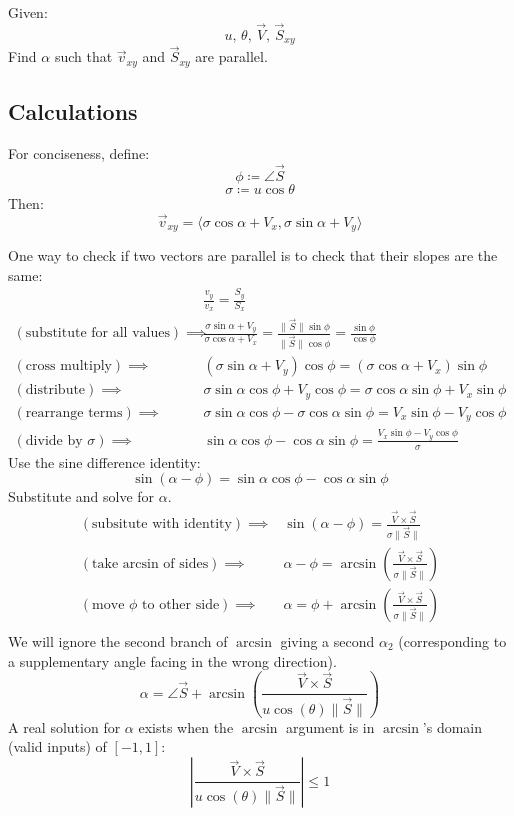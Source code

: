 \documentclass{article}
\begin{document}
Given:
\[ u,\,\theta,\,\vec{V},\,\vec{S}_{xy} \]
Find $\alpha$ such that $\vec{v}_{xy}$ and $\vec{S}_{xy}$ are parallel.

\subsection*{Calculations}
For conciseness, define:
\[ \phi\coloneqq\angle\vec{S} \]
\[ \sigma\coloneqq u\cos\theta \]
Then:
\[ \vec{v}_{xy}=\langle \sigma\cos\alpha+V_x,\sigma\sin\alpha+V_y \rangle \]

One way to check if two vectors are parallel is to check that their slopes are the same:
\begin{align*}
    &\frac{v_y}{v_x}=\frac{S_y}{S_x} \\
    (\text{substitute for all values})\implies&\frac{\sigma\sin\alpha+V_y}{\sigma\cos\alpha+V_x}=\frac{\lVert\vec{S}\rVert\sin\phi}{\lVert\vec{S}\rVert\cos\phi}=\frac{\sin\phi}{\cos\phi} \\
    (\text{cross multiply})\implies&(\sigma\sin\alpha+V_y)\cos\phi=(\sigma\cos\alpha+V_x)\sin\phi \\
    (\text{distribute})\implies&\sigma\sin\alpha\cos\phi+V_y\cos\phi=\sigma\cos\alpha\sin\phi+V_x\sin\phi \\
    (\text{rearrange terms})\implies&\sigma\sin\alpha\cos\phi-\sigma\cos\alpha\sin\phi=V_x\sin\phi-V_y\cos\phi \\
    (\text{divide by }\sigma)\implies&\sin\alpha\cos\phi-\cos\alpha\sin\phi=\frac{V_x\sin\phi-V_y\cos\phi}{\sigma}
\end{align*}
Use the sine difference identity:
\[ \sin(\alpha-\phi)=\sin\alpha\cos\phi-\cos\alpha\sin\phi \]
Substitute and solve for $\alpha$.
\begin{align*}
    (\text{subsitute with identity})\implies&\sin(\alpha-\phi)=\frac{\vec{V}\times\vec{S}}{\sigma\lVert\vec{S}\rVert} \\
    (\text{take arcsin of sides})\implies&\alpha-\phi=\arcsin\left(\frac{\vec{V}\times\vec{S}}{\sigma\lVert\vec{S}\rVert}\right) \\
    (\text{move }\phi\text{ to other side})\implies&\alpha=\phi+\arcsin\left(\frac{\vec{V}\times\vec{S}}{\sigma\lVert\vec{S}\rVert}\right) \\
\end{align*} 
We will ignore the second branch of $\arcsin$ giving a second $\alpha_2$ (corresponding to a supplementary angle facing in the wrong direction).
\[ \boxed{\alpha=\angle\vec{S}+\arcsin\left(\frac{\vec{V}\times\vec{S}}{u\cos(\theta)\lVert\vec{S}\rVert}\right)} \]
A real solution for $\alpha$ exists when the $\arcsin$ argument is in $\arcsin$'s domain (valid inputs) of $[-1, 1]$:
\[ \left\lvert\frac{\vec{V}\times\vec{S}}{u\cos(\theta)\lVert\vec{S}\rVert}\right\rvert\le1 \]
\end{document}

